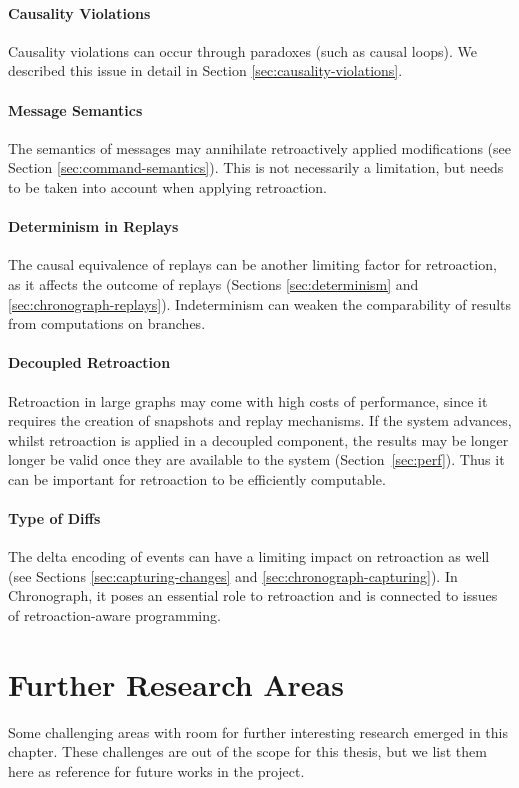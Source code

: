 \paragraph{Causality Violations} 
Causality violations can occur through paradoxes (such as causal loops).
We described this issue in detail in Section \ref{sec:causality-violations}.

\paragraph{Message Semantics} 
The semantics of messages may annihilate retroactively applied modifications
(see Section \ref{sec:command-semantics}).
This is not necessarily a limitation, but needs to be taken into account when 
applying retroaction.

\paragraph{Determinism in Replays}
The causal equivalence of replays can be another limiting factor for 
retroaction, as it affects the outcome of replays (Sections \ref{sec:determinism} 
and \ref{sec:chronograph-replays}). Indeterminism can weaken the comparability 
of results from computations on branches. 

\paragraph{Decoupled Retroaction}
Retroaction in large graphs may come with high costs of performance, since it 
requires the creation of snapshots and replay mechanisms. If the system advances, 
whilst retroaction is applied in a decoupled component, the results may be longer 
longer be valid once they are available to the system \mbox{(Section \ref{sec:perf})}. 
Thus it can be important for retroaction to be efficiently computable.

\paragraph{Type of Diffs}
The delta encoding of events can have a limiting impact on retroaction as well
(see Sections \ref{sec:capturing-changes} and \ref{sec:chronograph-capturing}).
In Chronograph, it poses an essential role to retroaction and is connected
to issues of retroaction-aware programming.

\section{Further Research Areas}
Some challenging areas with room for further interesting research emerged in this
chapter. These challenges are out of the scope for this thesis, but we list them 
here as reference for future works in the project.

